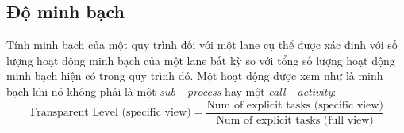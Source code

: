 \subsection{Độ minh bạch}
Tính minh bạch của một quy trình đối với một lane cụ thể được xác định với số lượng hoạt động minh bạch của một lane bất kỳ so với tổng số lượng hoạt động minh bạch hiện có trong quy trình đó. Một hoạt động được xem như là minh bạch khi nó không phải là một \emph{sub - process} hay một \emph{call - activity}:
\[ \text{Transparent Level (specific view)}  = \frac{\text{Num of explicit tasks (specific view)} }{\text{Num of explicit tasks (full view)}}\]
